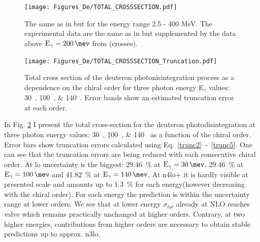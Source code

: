     
    \begin{figure}[htb!]
        \begin{center}
        \texttt{[image: Figures\_De/TOTAL\_CROSSSECTION.pdf]}
        \end{center}
        \caption{The same as in  but for the energy range 2.5 - 400 MeV.
        The experimental data are the same as in 
        but supplemented by the data above $\text{E}_\gamma=\SI{200}{\mev}$ from
        \cite{ARENDS1984} (crosses).
        }
        \label{TOTAL_CROSS}
    \end{figure}

    \begin{figure}[htb!]
        \begin{center}
            \texttt{[image: Figures\_De/TOTAL\_CROSSSECTION\_Truncation.pdf]}
        \end{center}
        \caption{Total cross section of the deuteron photonisintegration
        process as a dependence on the chiral order for three photon energy E$_\gamma$ values: \SIlist[list-units = single]{30;100;140}{\mev}.
        Error bands show an estimated truncation error at each order.}
        \label{Trunc_100}
    \end{figure}
    
    In Fig. \ref{Trunc_100} I present the
    total cross-section for the deuteron photodisintegration 
    at three photon energy values: \SIlist[list-units = single]{30;100;140}{\mev} as a function of the chiral order.
    Error bars show truncation errors calculated using Eq.~\ref{trunc2}~-~\ref{trunc5}.
    One can see that the truncation errors are being reduced with each consecutive chiral order. 
    At \gls{lo} uncertainty is the biggest: \SI{29.46}{\percent} at $\text{E}_\gamma = \SI{30}{\mev}$,
    \SI{29.46}{\percent} at $\text{E}_\gamma = \SI{100}{\mev}$ and
    \SI{41.82}{\percent} at $\text{E}_\gamma = \SI{140}{\mev}$.
    At \gls{n4lo+} it is hardly visible at presented scale and amounts up to 
    \SI{1.3}{\percent} for each energy(however decreasing with the chiral order).
    For each energy the prediction is within the uncertainty range at lower orders.
    We see that at lower energy $\sigma_{tot}$ already at NLO reaches valve which remains
    practically unchanged at higher orders.
    Contrary, at two higher energies, contributions from higher orders are necessary to obtain 
    stable predictions up to approx. \gls{n3lo}.

